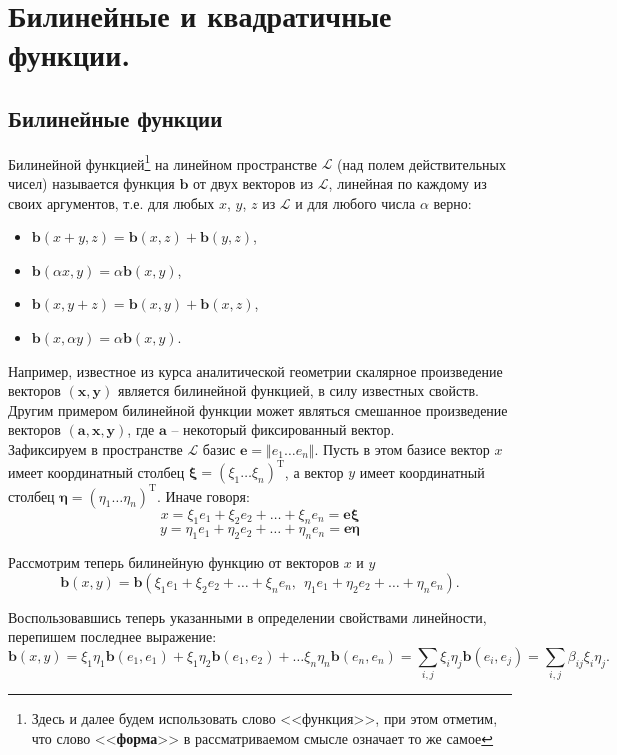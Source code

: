 \chapter{Билинейные и квадратичные функции.}
\section{Билинейные функции}
Билинейной функцией\footnote{Здесь и далее будем использовать слово <<функция>>, при этом отметим, что слово <<\textbf{форма}>> в рассматриваемом смысле означает то же самое} на линейном пространстве $\mathcal{L}$ (над полем действительных чисел)  называется функция $\mathbf{b}$ от двух векторов из $\mathcal{L}$, линейная по каждому из своих аргументов, т.е. для любых $x$, $y$, $z$ из  $\mathcal{L}$ и для любого числа $\alpha$ верно:

\begin{itemize}
\item $\mathbf{b}(x+y,z)=\mathbf{b}(x,z)+\mathbf{b}(y,z)$,
\item $\mathbf{b}(\alpha x,y)=\alpha \mathbf{b}(x,y)$,
\item $\mathbf{b}(x,y+z)=\mathbf{b}(x,y)+\mathbf{b}(x,z)$,
\item $\mathbf{b}( x,\alpha y)=\alpha \mathbf{b}(x,y)$.
\end{itemize}

Например, известное из курса аналитической геометрии скалярное произведение векторов $(\mathbf{x},\mathbf{y})$ является билинейной функцией, в силу известных свойств. Другим примером билинейной функции может являться смешанное произведение векторов $(\mathbf{a},\mathbf{x},\mathbf{y})$, где $\mathbf{a}$ -- некоторый фиксированный вектор.\\

Зафиксируем в пространстве $\mathcal{L}$ базис $\mathbf{e}=\Vert e_1 \ldots e_n\Vert$. Пусть в этом базисе вектор $x$ имеет координатный столбец $\bm{\xi}=(\xi_1\ldots\xi_n)^{\text{T}}$, а вектор $y$ имеет координатный столбец $\bm{\eta}=(\eta_1\ldots\eta_n)^{\text{T}}$. Иначе говоря:$$x=\xi_1e_1+\xi_2e_2+\ldots+\xi_ne_n=\mathbf{e}\bm{\xi}$$$$
y=\eta_1e_1+\eta_2e_2+\ldots+\eta_ne_n=\mathbf{e}\bm{\eta}$$

Рассмотрим теперь билинейную функцию от векторов $x$ и $y$
$$\mathbf{b}(x,y)=\mathbf{b}(\xi_1e_1+\xi_2e_2+\ldots+\xi_ne_n,\hspace{5pt} \eta_1e_1+\eta_2e_2+\ldots+\eta_ne_n).$$

Воспользовавшись теперь указанными в определении свойствами линейности, перепишем последнее выражение:
$$\mathbf{b}(x,y)=\xi_1\eta_1\mathbf{b}(e_1,e_1)+\xi_1\eta_2\mathbf{b}(e_1, e_2)+\ldots\xi_n\eta_n\mathbf{b}(e_n,e_n)= \sum_{i,j}\xi_i\eta_j\mathbf{b}(e_i,e_j)=\sum_{i,j}\beta_{ij}\xi_i\eta_j.$$

